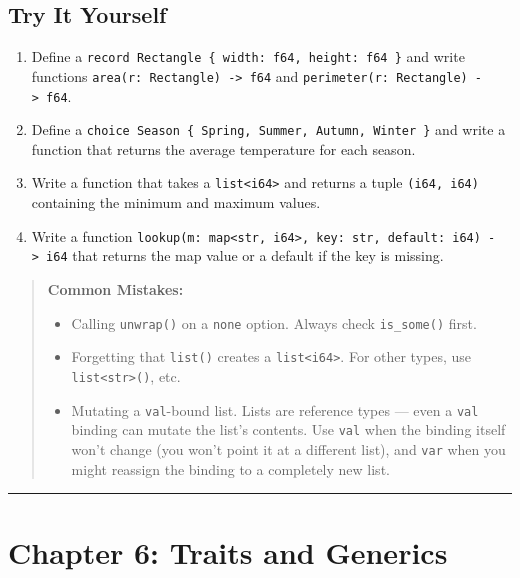 \documentclass[
  english,
]{book}
\providecommand{\tightlist}{%
  \setlength{\itemsep}{0pt}\setlength{\parskip}{0pt}}
\begin{document}
\subsection{Try It Yourself}\label{try-it-yourself-4}

\begin{enumerate}
\def\labelenumi{\arabic{enumi}.}
\tightlist
\item
  Define a
  \texttt{record\ Rectangle\ \{\ width:\ f64,\ height:\ f64\ \}} and
  write functions \texttt{area(r:\ Rectangle)\ -\textgreater{}\ f64} and
  \texttt{perimeter(r:\ Rectangle)\ -\textgreater{}\ f64}.
\item
  Define a
  \texttt{choice\ Season\ \{\ Spring,\ Summer,\ Autumn,\ Winter\ \}} and
  write a function that returns the average temperature for each season.
\item
  Write a function that takes a
  \texttt{list\textless{}i64\textgreater{}} and returns a tuple
  \texttt{(i64,\ i64)} containing the minimum and maximum values.
\item
  Write a function
  \texttt{lookup(m:\ map\textless{}str,\ i64\textgreater{},\ key:\ str,\ default:\ i64)\ -\textgreater{}\ i64}
  that returns the map value or a default if the key is missing.
\end{enumerate}

\begin{quote}
\textbf{Common Mistakes:}

\begin{itemize}
\tightlist
\item
  Calling \texttt{unwrap()} on a \texttt{none} option. Always check
  \texttt{is\_some()} first.
\item
  Forgetting that \texttt{list()} creates a
  \texttt{list\textless{}i64\textgreater{}}. For other types, use
  \texttt{list\textless{}str\textgreater{}()}, etc.
\item
  Mutating a \texttt{val}-bound list. Lists are reference types --- even
  a \texttt{val} binding can mutate the list's contents. Use
  \texttt{val} when the binding itself won't change (you won't point it
  at a different list), and \texttt{var} when you might reassign the
  binding to a completely new list.
\end{itemize}
\end{quote}

\begin{center}\rule{0.5\linewidth}{0.5pt}\end{center}

\section{Chapter 6: Traits and
Generics}\label{chapter-6-traits-and-generics}
\end{document}

